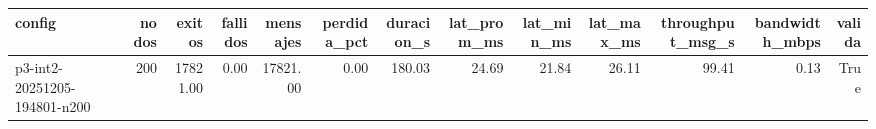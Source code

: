 \begin{tabular}{lrrrrrrrrrrrr}
\toprule
config & nodos & exitos & fallidos & mensajes & perdida_pct & duracion_s & lat_prom_ms & lat_min_ms & lat_max_ms & throughput_msg_s & bandwidth_mbps & valida \\
\midrule
p3-int2-20251205-194801-n200 & 200 & 17821.00 & 0.00 & 17821.00 & 0.00 & 180.03 & 24.69 & 21.84 & 26.11 & 99.41 & 0.13 & True \\
\bottomrule
\end{tabular}
